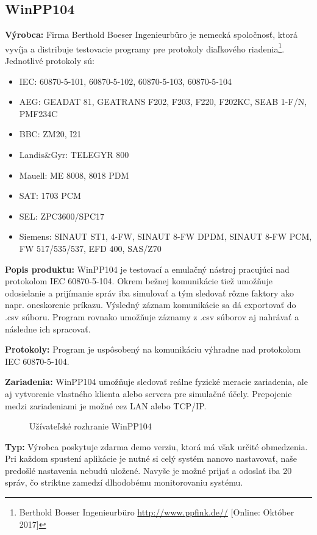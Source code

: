 \subsection{WinPP104}
\textbf{Výrobca:} Firma Berthold Boeser Ingenieurbüro je nemecká spoločnosť, ktorá vyvíja a distribuje testovacie programy pre protokoly diaľkového riadenia\footnote{Berthold Boeser Ingenieurbüro \url{http://www.ppfink.de//} [Online: Október 2017]}. Jednotlivé protokoly sú: 
\begin{itemize}
\item IEC: 60870-5-101, 60870-5-102, 60870-5-103, 60870-5-104
\item AEG: GEADAT 81, GEATRANS F202, F203, F220, F202KC, SEAB 1-F/N, PMF234C
\item BBC: ZM20, I21
\item Landis\&Gyr: TELEGYR 800
\item Mauell: ME 8008, 8018 PDM
\item SAT: 1703 PCM
\item SEL: ZPC3600/SPC17
\item Siemens: SINAUT ST1, 4-FW, SINAUT 8-FW DPDM, SINAUT 8-FW PCM, FW 517/535/537, EFD 400, SAS/Z70
\end{itemize} \par
\noindent \textbf{Popis produktu:} WinPP104 je testovací a emulačný nástroj pracujúci nad protokolom IEC 60870-5-104. Okrem bežnej komunikácie tiež umožňuje odosielanie a prijímanie správ iba simulovať a tým sledovať rôzne faktory ako napr. oneskorenie príkazu. Výsledný záznam komunikácie sa dá exportovať do .csv súboru. Program rovnako umožňuje záznamy z .csv súborov aj nahrávať a následne ich spracovať. \par
\noindent \textbf{Protokoly:} Program je uspôsobený na komunikáciu výhradne nad protokolom IEC 60870-5-104. \par
\noindent \textbf{Zariadenia:} WinPP104 umožňuje sledovať reálne fyzické meracie zariadenia, ale aj vytvorenie vlastného klienta alebo servera pre simulačné účely. Prepojenie medzi zariadeniami je možné cez LAN alebo TCP/IP. \par
\begin{figure}[H]
    \centering
    \caption{Užívateľské rozhranie WinPP104}
\label{WinPP104}
\end{figure}
\noindent \textbf{Typ:} Výrobca poskytuje zdarma demo verziu, ktorá má však určité obmedzenia. Pri každom spustení aplikácie je nutné si celý systém nanovo nastavovať, naše predošlé nastavenia nebudú uložené. Navyše je možné prijať a odoslať iba 20 správ, čo striktne zamedzí dlhodobému monitorovaniu systému. \par
